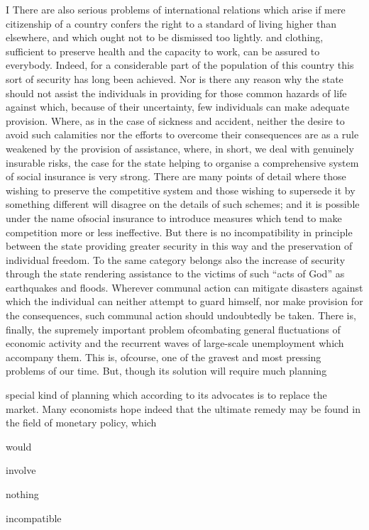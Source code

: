 \documentclass[11pt,openany]{book}
\begin{document}
I There are also serious problems of international relations which arise if mere citizenship of a country confers the right to a standard of living higher than elsewhere, and which ought not to be dismissed too lightly. and clothing, sufficient to preserve health and the capacity to work, can be assured to everybody. Indeed, for a considerable part of the population of this country this sort of security has long been achieved. Nor is there any reason why the state should not assist the individuals in providing for those common hazards of life against which, because of their uncertainty, few individuals can make adequate provision. Where, as in the case of sickness and accident, neither the desire to avoid such calamities nor the efforts to overcome their consequences are as a rule weakened by the provision of assistance, where, in short, we deal with genuinely insurable risks, the case for the state helping to organise a comprehensive system of social insurance is very strong. There are many points of detail where those wishing to preserve the competitive system and those wishing to supersede it by something different will disagree on the details of such schemes; and it is possible under the name ofsocial insurance to introduce measures which tend to make competition more or less ineffective. But there is no incompatibility in principle between the state providing greater security in this way and the preservation of individual freedom. To the same category belongs also the increase of security through the state rendering assistance to the victims of such ``acts of God'' as earthquakes and floods. Wherever communal action can mitigate disasters against which the individual can neither attempt to guard himself, nor make provision for the consequences, such communal action should undoubtedly be taken. There is, finally, the supremely important problem ofcombating general fluctuations of economic activity and the recurrent waves of large-scale unemployment which accompany them. This is, ofcourse, one of the gravest and most pressing problems of our time. But, though its solution will require much planning

special kind of planning which according to its advocates is to replace the market. Many economists hope indeed that the ultimate remedy may be found in the field of monetary policy, which

would

involve

nothing

incompatible
\end{document}
